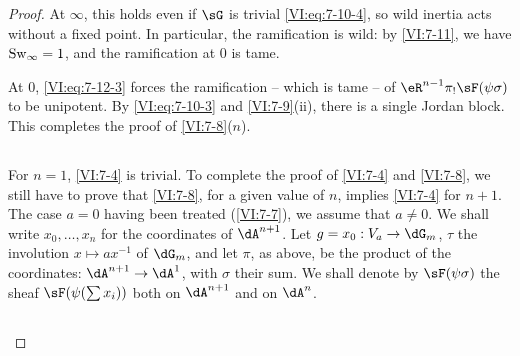 \begin{proof}[Proof]
At $\infty$, this holds even if $\sG$ is trivial \eqref{VI:eq:7-10-4}, 
so wild inertia acts without a fixed point. In particular, the 
ramification is wild: by \ref{VI:7-11}, we have $\operatorname{Sw}_\infty=1$, and the 
ramification at $0$ is tame. 

At $0$, \eqref{VI:eq:7-12-3} forces the ramification -- which is tame -- of 
$\eR^{n-1} \pi_! \sF(\psi\sigma)$ to be unipotent. By 
\eqref{VI:eq:7-10-3} and \ref{VI:7-9}(ii), there is a single Jordan block. This 
completes the proof of \ref{VI:7-8}($n$). 





\subsection{}\label{VI:7-13}

For $n=1$, \ref{VI:7-4} is trivial. To complete the proof of \ref{VI:7-4} and 
\ref{VI:7-8}, we still have to prove that \ref{VI:7-8}, for a given value 
of $n$, implies \ref{VI:7-4} for $n+1$. The case $a=0$ having been 
  treated (\ref{VI:7-7}), we assume that $a\ne 0$. We shall write $x_0,\dots,x_n$ for 
the coordinates of $\dA^{n+1}$. Let $g=x_0:V_a\to \dG_m$, $\tau$ 
the involution $x\mapsto a x^{-1}$ of $\dG_m$, and let $\pi$, as above, be the 
product of the coordinates: $\dA^{n+1} \to \dA^1$, with $\sigma$ their sum. We 
shall denote by $\sF(\psi\sigma)$ the sheaf $\sF(\psi(\sum x_i))$ both on $\dA^{n+1}$ 
and on $\dA^n$. 





\subsection{}\label{VI:7-14}


\end{proof}
